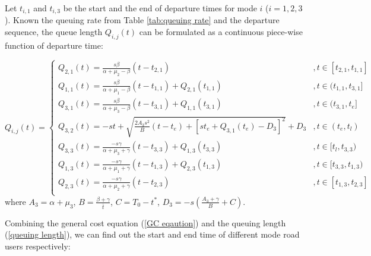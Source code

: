 \documentclass[a4paper,11pt]{article}
\begin{document}
Let $t_{i,1}$ and $t_{i,3}$ be the start and the end of departure times for mode $i$ ($i=1,2,3$). Known the queuing rate from Table \ref{tab:queuing rate} and the departure sequence, the queue length $Q_{i,j}(t)$ can be formulated as a continuous piece-wise function of departure time:

\begin{equation} \label{queuing length}
    Q_{i,j}(t)=\left\{
    \begin{array}{cl}
        Q_{2,1}\left(t\right)=\frac{s\beta}{\alpha+\mu_2-\beta}(t-t_{2,1}) & ,t\in\left[t_{2,1},t_{1,1}\right] \\
        Q_{1,1}\left(t\right)=\frac{s\beta}{\alpha+\mu_1-\beta}(t-t_{1,1})+Q_{2,1}\left(t_{1,1}\right) & ,t\in(t_{1,1},t_{3,1}] \\
        Q_{3,1}\left(t\right)=\frac{s\beta}{\alpha+\mu_3-\beta}(t-t_{3,1})+Q_{1,1}\left(t_{3,1}\right) & ,t\in(t_{3,1},t_e] \\
        Q_{3,2}\left(t\right)=-st+\sqrt{\frac{2A_3s^2}{B}\left(t-t_e\right)+\left[st_e+Q_{3,1}\left(t_e\right)-D_3\right]^2}+D_3 & ,t\in\left(t_e,t_l\right) \\
        Q_{3,3}\left(t\right)=\frac{-s\gamma}{\alpha+\mu_3+\gamma}(t-t_{3,3})+Q_{1,3}\left(t_{3,3}\right) & ,t\in[t_l,t_{3,3}) \\
        Q_{1,3}\left(t\right)=\frac{-s\gamma}{\alpha+\mu_1+\gamma}(t-t_{1,3})+Q_{2,3}\left(t_{1,3}\right) & ,t\in[t_{3,3},t_{1,3}) \\
        Q_{2,3}\left(t\right)=\frac{-s\gamma}{\alpha+\mu_2+\gamma}(t-t_{2,3}) & ,t\in\left[t_{1,3},t_{2,3}\right] \\
    \end{array}
    \right.
\end{equation}
where $A_3=\alpha+\mu_3$, $B=\frac{\beta+\gamma}{\bar{t}}$, $C=T_0-t^*$, $D_3=-s\left(\frac{A_3+\gamma}{B}+C\right)$.

Combining the general cost equation (\ref{GC eqaution}) and the queuing length (\ref{queuing length}), we can find out the start and end time of different mode road users respectively:
\end{document}
